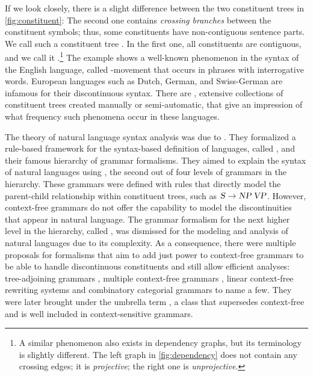 \documentclass[../document.tex]{subfiles}
\begin{document}
    If we look closely, there is a slight difference between the two constituent trees in \cref{fig:constituent}:
        The second one contains \emph{crossing branches} between the constituent symbols; thus, some constituents have non-contiguous sentence parts.
    We call such a constituent tree .
    In the first one, all constituents are contiguous, and we call it .\footnote{
        A similar phenomenon also exists in dependency graphs, but its terminology is slightly different.
        The left graph in \cref{fig:dependency} does not contain any crossing edges; it is \emph{projective}; the right one is \emph{unprojective}.
    }
    The example shows a well-known phenomenon in the syntax of the English language, called -movement that occurs in phrases with interrogative words.
    European languages such as Dutch, German, and Swiss-German are infamous for their discontinuous syntax. \citep{Shieber85,Becker91}
    There are , extensive collections of constituent trees created manually or semi-automatic, that give an impression of what frequency such phenomena occur in these languages. \citep{Marcus94,EvaKal11,Skut98,Brants04,Noo13}
    
    The theory of natural language syntax analysis was due to \citet{Cho56}.
    They formalized a rule-based framework for the syntax-based definition of languages, called , and their famous hierarchy of grammar formalisms.
    They aimed to explain the syntax of natural languages using , the second out of four levels of grammars in the hierarchy.
    These grammars were defined with rules that directly model the parent-child relationship within constituent trees, such as \(\textsc{\textsl{S}} \to \textsc{\textsl{NP}}\,\textsc{\textsl{VP}}\).
    However, context-free grammars do not offer the capability to model the discontinuities that appear in natural language. \citep{Shieber85}
    The grammar formalism for the next higher level in the hierarchy, called , was dismissed for the modeling and analysis of natural languages due to its complexity.
    As a consequence, there were multiple proposals for formalisms that aim to add just power to context-free grammars to be able to handle discontinuous constituents and still allow efficient analyses:
        tree-adjoining grammars \citep{JosLevTak75}, multiple context-free grammars \citep{SekMatFujKas91}, linear context-free rewriting systems \citep{VijWeiJos87} and combinatory categorial grammars \citep{Ste11} to name a few.
    They were later brought under the umbrella term , a class that supersedes context-free and is well included in context-sensitive grammars.
    
\end{document}
